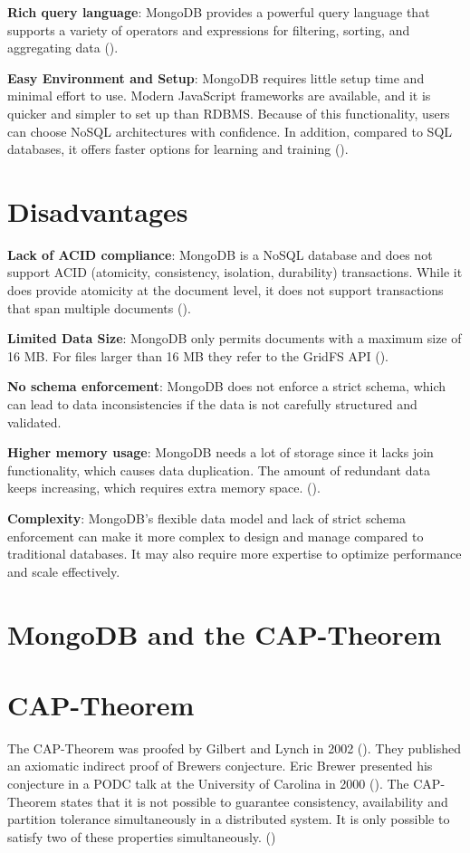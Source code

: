 \textbf{Rich query language}: MongoDB provides a powerful query language that supports a variety of operators and expressions for filtering, sorting, and aggregating data (\cite{mongodb-query}).

\textbf{Easy Environment and Setup}: MongoDB requires little setup time and minimal effort to use. Modern JavaScript frameworks are available, and it is quicker and simpler to set up than RDBMS.
Because of this functionality, users can choose NoSQL architectures with confidence. In addition, compared to SQL databases, it offers faster options for learning and training (\cites{knowledgenile-pro-con}{jamsheer_2019}). 

\section{Disadvantages}
\textbf{Lack of ACID compliance}: MongoDB is a NoSQL database and does not support ACID (atomicity, consistency, isolation, durability) transactions. While it does provide atomicity at the document level, it does not support transactions that span multiple documents (\cites{mongodb-transactions}{knowledgenile-pro-con}).

\textbf{Limited Data Size}: MongoDB only permits documents with a maximum size of 16 MB. For files larger than 16 MB they refer to the GridFS API (\cite{mongodb-documents}).

\textbf{No schema enforcement}: MongoDB does not enforce a strict schema, which can lead to data inconsistencies if the data is not carefully structured and validated.

\textbf{Higher memory usage}: MongoDB needs a lot of storage since it lacks join functionality, which causes data duplication. The amount of redundant data keeps increasing, which requires extra memory space. (\cite{knowledgenile-pro-con}).

\textbf{Complexity}: MongoDB's flexible data model and lack of strict schema enforcement can make it more complex to design and manage compared to traditional databases. It may also require more expertise to optimize performance and scale effectively.

\pagebreak
\section{MongoDB and the CAP-Theorem}
\section*{CAP-Theorem}
The \ac{CAP}-Theorem was proofed by Gilbert and Lynch in 2002 (\cite{brewer:2002}). They published an axiomatic indirect proof of Brewers conjecture. Eric Brewer presented his conjecture in a \ac{PODC} talk at the University of Carolina in 2000 (\cite{brewer:2000}). The \ac{CAP}-Theorem states that it is not possible to guarantee consistency, availability and partition tolerance simultaneously in a distributed system. It is only possible to satisfy two of these properties simultaneously. (\cite[p.~1]{brewer:2002})
